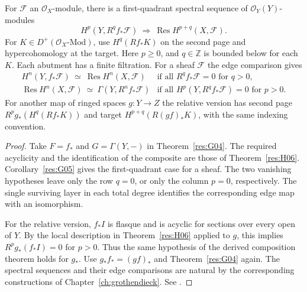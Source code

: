 \begin{theorem}
\label{res:H07}
For \(\mathcal F\) an \(\mathcal O_X\)-module, there is a first-quadrant
spectral sequence of \(\mathcal O_Y(Y)\)-modules
\[
 H^p(Y,R^q f_*\mathcal F)\ \Longrightarrow\
     \operatorname{Res} H^{p+q}(X,\mathcal F).
\]
For \(K\in D^+(\mathcal O_X\text{-}\mathrm{Mod})\), use \(H^q(Rf_*K)\)
on the second page and hypercohomology at the target. Here \(p\ge0\),
and \(q\in\mathbb Z\) is bounded below for each \(K\). Each abutment has a
finite filtration. For a sheaf \(\mathcal F\) the edge comparison gives
\[
\begin{array}{ll}
 H^n(Y,f_*\mathcal F)\ \simeq\ \operatorname{Res}H^n(X,\mathcal F)
    &\text{if all }R^q f_*\mathcal F=0\text{ for }q>0,\\[2pt]
 \operatorname{Res}H^n(X,\mathcal F)\ \simeq\
    \Gamma(Y,R^n f_*\mathcal F)
    &\text{if all }H^p(Y,R^q f_*\mathcal F)=0\text{ for }p>0 .
\end{array}
\]
For another map of ringed spaces \(g:Y\to Z\) the relative version has
second page \(R^p g_*(H^q(Rf_*K))\) and target
\(H^{p+q}(R(gf)_*K)\), with the same indexing convention.
\end{theorem}
\begin{proof}
Take \(F=f_*\) and \(G=\Gamma(Y,-)\) in
Theorem~\ref{res:G04}. The required acyclicity and the identification
of the composite are those of Theorem~\ref{res:H06}.
Corollary~\ref{res:G05} gives the first-quadrant case for a sheaf.
The two vanishing hypotheses leave only the row \(q=0\), or only the
column \(p=0\), respectively. The single surviving layer in each
total degree identifies the corresponding edge map with an isomorphism.

For the relative version, \(f_*I\) is flasque and is acyclic for
sections over every open of \(Y\). By the local description in
Theorem~\ref{res:H06} applied to \(g\), this implies
\(R^p g_*(f_*I)=0\) for \(p>0\). Thus the same hypothesis of the
derived composition theorem holds for \(g_*\).
Use \(g_*f_*=(gf)_*\) and Theorem~\ref{res:G04} again. The spectral
sequences and their edge comparisons are natural by the corresponding
constructions of Chapter~\ref{ch:grothendieck}.
See \cite[Tags 01F2, 01F4, 01F6]{stacks-sheaf}.
\end{proof}
